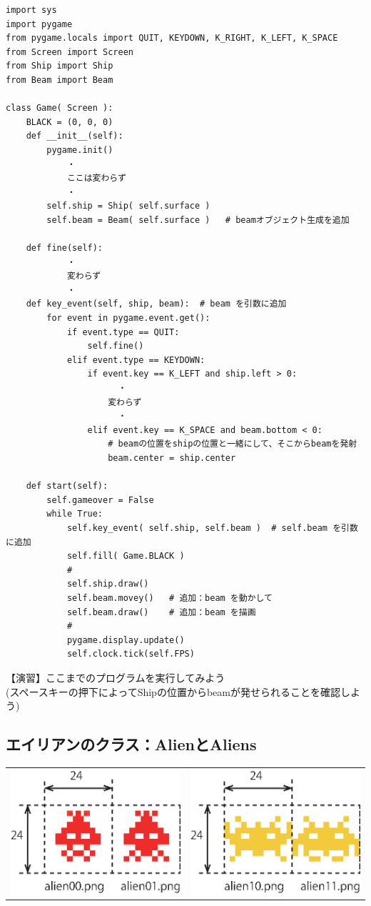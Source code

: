 \documentclass[uplatex,a4paper,11pt,oneside,openany]{jsbook}
\begin{document}
\begin{lstlisting}[caption=Gameクラス（beamオブジェクトを追加）,label=p001-2]
import sys
import pygame
from pygame.locals import QUIT, KEYDOWN, K_RIGHT, K_LEFT, K_SPACE
from Screen import Screen
from Ship import Ship
from Beam import Beam

class Game( Screen ):
    BLACK = (0, 0, 0)
    def __init__(self):
        pygame.init()
            ・
            ここは変わらず
            ・
        self.ship = Ship( self.surface )
        self.beam = Beam( self.surface )   # beamオブジェクト生成を追加

    def fine(self):
            ・
            変わらず
            ・
    def key_event(self, ship, beam):  # beam を引数に追加
        for event in pygame.event.get():
            if event.type == QUIT:
                self.fine()
            elif event.type == KEYDOWN:
                if event.key == K_LEFT and ship.left > 0:
                      ・
                    変わらず
                      ・
                elif event.key == K_SPACE and beam.bottom < 0:
                    # beamの位置をshipの位置と一緒にして、そこからbeamを発射
                    beam.center = ship.center

    def start(self):
        self.gameover = False
        while True:
            self.key_event( self.ship, self.beam )  # self.beam を引数に追加
            self.fill( Game.BLACK )
            #
            self.ship.draw()
            self.beam.movey()   # 追加：beam を動かして
            self.beam.draw()    # 追加：beam を描画
            #
            pygame.display.update()
            self.clock.tick(self.FPS)
\end{lstlisting}

【演習】ここまでのプログラムを実行してみよう\\
(スペースキーの押下によってShipの位置からbeamが発せられることを確認しよう)

\subsection{エイリアンのクラス：AlienとAliens}

\begin{table}[htb]
\begin{center}
    \begin{tabular}{cc}
    \includegraphics[width=0.3\hsize]{figures/eps/alien0.eps} & \includegraphics[width=0.3\hsize]{figures/eps/alien1.eps}
  \end{tabular}
\end{center}
\end{table}
\end{document}
